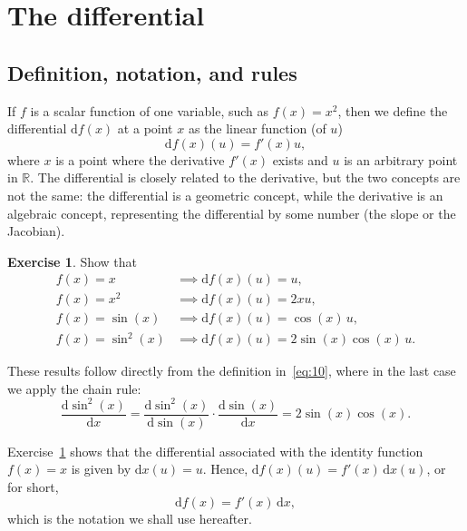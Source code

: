 \documentclass[12pt,a4paper]{article}
\makeatletter
\theoremstyle{definition}
\newtheorem{exercise}{Exercise}
\renewenvironment{proof}[1][\proofname]{\par
  \pushQED{\qed}%
  \normalfont \topsep6\p@\@plus6\p@\relax
  \trivlist
  \item[\hskip\labelsep\bfseries #1\@addpunct{.}]\ignorespaces
}{%
  \popQED\endtrivlist\@endpefalse
}
\newenvironment{solution}{%
  \begin{proof}[Solution]%
}{%
  \end{proof}%
}
\newcommand{\dd}{\mathrm{d}}
\makeatother
\begin{document}
\section{The differential}\label{sec:4}

\subsection{Definition, notation, and rules}\label{sec:4.1}

If $f$ is a scalar function of one variable, such as $f(x) = x^2$, then we define the differential $\dd f(x)$ at a point $x$ as the linear function (of $u$)
\begin{equation}\label{eq:10}
\dd f(x)(u) = f'(x) u,
\end{equation}
where $x$ is a point where the derivative $f'(x)$ exists and $u$ is an arbitrary point in $\mathbb{R}$. The differential is closely related to the derivative, but the two concepts are not the same: the differential is a geometric concept, while the derivative is an algebraic concept, representing the differential by some number (the slope or the Jacobian). %

\begin{exercise}\label{exer:6}
Show that
\begin{align*}
f(x) = x &\implies \dd f(x)(u) = u, \\
f(x) = x^2 &\implies \dd f(x)(u) = 2xu, \\
f(x) = \sin(x) &\implies \dd f(x)(u) = \cos(x)\, u, \\
f(x) = \sin^2(x) &\implies \dd f(x)(u) = 2\sin(x)\cos(x)\, u.
\end{align*}
\end{exercise}

\begin{solution}
These results follow directly from the definition in~\eqref{eq:10}, where in the last case we apply the chain rule:
\[
\frac{\dd\sin^2(x)}{\dd x} = \frac{\dd\sin^2(x)}{\dd\sin(x)} \cdot \frac{\dd\sin(x)}{\dd x} = 2\sin(x)\cos(x).
\]
\end{solution}

Exercise~\ref{exer:6} shows that the differential associated with the identity function $f(x) = x$ is given by $\dd x(u) = u$. Hence, $\dd f(x)(u) = f'(x)\, \dd x(u)$, or for short,
\begin{equation}\label{eq:11}
\dd f(x) = f'(x)\, \dd x,
\end{equation}
which is the notation we shall use hereafter. %
\end{document}
